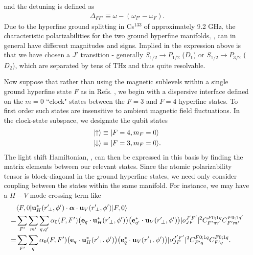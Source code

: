\documentclass[preprint,aps,pra,onecolumn]{revtex4-1} %
\renewcommand{\tensor}[1]{\boldsymbol{#1}}
\begin{document}
and the detuning is defined as
\begin{align}
	\Delta_{FF'} \equiv \omega - (\omega_{F'} - \omega_{F}).
\end{align}
Due to the hyperfine ground splitting in Cs$^{133}$ of approximately 9.2 GHz, the characteristic 
polarizabilities for the two ground hyperfine manifolds, , can in 
general have different magnitudes and signs.  Implied in the expression above is that we have chosen a 
$J'$ transition - generally $S_{1/2} \rightarrow P_{1/2}$ ($D_1$) or $S_{1/2} \rightarrow P_{3/2}$ ($D_2$), 
which are 
separated by tens of THz and thus quite resolvable.   

Now suppose that rather than using the magnetic sublevels within a single ground hyperfine state $F$ as 
in Refs. \cite{Deutsch2010a}, we begin with a dispersive interface defined on the $m=0$ ``clock" states 
between the $F=3$ and $F=4$ hyperfine states.  To first order such states are insensitive to ambient 
magnetic field fluctuations.  In the clock-state subspace, we designate the qubit states
\begin{align} 
	\lvert{\uparrow}\rangle &\equiv \lvert{F = 4,m_F = 0}\rangle \\
 	\lvert{\downarrow}\rangle &\equiv \lvert{F = 3,m_F=0}\rangle.
\end{align}
The light shift Hamiltonian, , can then be expressed in this basis by finding 
the 
matrix elements between our relevant states.  Since the atomic polarizability tensor is block-diagonal in 
the ground hyperfine states, we need only consider coupling between the states within the same 
manifold.  
For instance, we may have a $H-V$ mode crossing term like
\begin{align} \label{eq:ClockMatrixElement}
	&\bra{F,0} \mathbf{u}^*_H(r^\prime\!_\perp, \phi') \cdot \tensor{\alpha} \cdot 
	\mathbf{u}_{V}(r^\prime\!_\perp, \phi') \ket{F,0}\nonumber\\
  =& 
	\sum_{F'} \sum_{m'} \sum_{q, q'} \alpha_0(F,F') \big( \mathbf{e}_q \cdot 
	\mathbf{u}^*_H(r^\prime\!_\perp, \phi') \big) 
	\big( \mathbf{e}^*_{q'} \cdot \mathbf{u}_V(r^\prime\!_\perp, \phi') \big) |o^{J'F'}_{JF} |^2 C^{F 0;1 
	q}_{F' m'} C^{F 
	0;1q'}_{F' m'} \\
 = & \sum_{F'} \sum_{q} \alpha_0(F,F') \big( \mathbf{e}_q \cdot \mathbf{u}^*_H(r^\prime\!_\perp, \phi') 
	\big) \big( 
	\mathbf{e}^*_{q} \cdot \mathbf{u}_V(r^\prime\!_\perp, \phi') \big) |o^{J'F'}_{JF} |^2 C^{F 0;1q}_{F' q} 
	C^{F 0;1q}_{F' q}.
\end{align}
\end{document}
